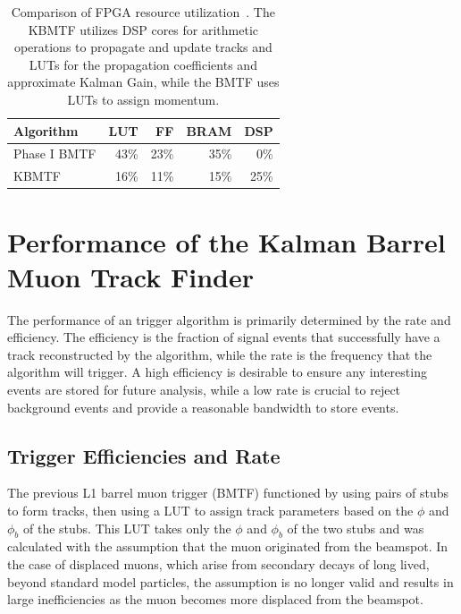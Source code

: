 \begin{table} [h!]
	\centering
	\begin{tabular}{|l|r r r r|}
	\hline
	Algorithm & LUT & FF & BRAM & DSP \\
	\hline
	Phase I BMTF & 43\% & 23\% & 35\% & 0\%\\
	KBMTF & 16\% & 11\% & 15\% & 25\% \\
	\hline 
	\end{tabular}
	\caption[Comparison of FPGA resource utilization~\cite{CERN-LHCC-2020-004}. The KBMTF utilizes DSP cores for arithmetic operations to propagate and update tracks and LUTs for the propagation coefficients and approximate Kalman Gain, while the BMTF uses LUTs to assign momentum.]
	{Comparison of FPGA resource utilization~\cite{CERN-LHCC-2020-004}. The KBMTF utilizes DSP cores for arithmetic operations to propagate and update tracks and LUTs for the propagation coefficients and approximate Kalman Gain, while the BMTF uses LUTs to assign momentum.}
	\label{tab:kmtfFW}
\end{table}

\section{Performance of the Kalman Barrel Muon Track Finder} \label{sec:kmtf_performance}
The performance of an trigger algorithm is primarily determined by the rate and efficiency. The efficiency is the fraction of signal events that successfully have a track reconstructed by the algorithm, while the rate is the frequency that the algorithm will trigger. A high efficiency is desirable to ensure any interesting events are stored for future analysis, while a low rate is crucial to reject background events and provide a reasonable bandwidth to store events.

\subsection{Trigger Efficiencies and Rate} \label{sec:kmtf_eff}
The previous L1 barrel muon trigger (BMTF) functioned by using pairs of stubs to form tracks, then using a LUT to assign track parameters based on the $\phi$ and $\phi_b$ of the stubs. This LUT takes only the $\phi$ and $\phi_b$ of the two stubs and was calculated with the assumption that the muon originated from the beamspot. In the case of displaced muons, which arise from secondary decays of long lived, beyond standard model particles, the assumption is no longer valid and results in large inefficiencies as the muon becomes more displaced from the beamspot.

